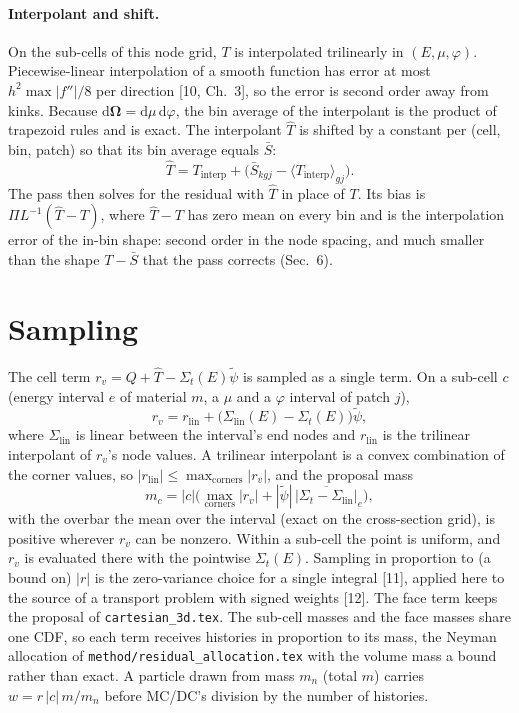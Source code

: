 \documentclass[11pt]{article}
\newcommand{\tpsi}{\tilde\psi}
\newcommand{\Sbar}{\bar S}
\newcommand{\Sigt}{\Sigma_t}
\newcommand{\Om}{\boldsymbol\Omega}
\newcommand{\That}{\hat T}
\begin{document}
\paragraph{Interpolant and shift.} On the sub-cells of this node grid, $T$ is
interpolated trilinearly in $(E,\mu,\varphi)$. Piecewise-linear interpolation of a
smooth function has error at most $h^2\max|f''|/8$ per direction [10, Ch.~3], so the
error is second order away from kinks. Because $\mathrm d\Om = \mathrm d\mu\,
\mathrm d\varphi$, the bin average of the interpolant is the product of trapezoid
rules and is exact. The interpolant $\That$ is shifted by a constant per (cell, bin,
patch) so that its bin average equals $\Sbar$:
\begin{equation}
  \That = T_{\text{interp}} + \big(\Sbar_{kgj} - \langle T_{\text{interp}}\rangle_{gj}\big).
\end{equation}
The pass then solves for the residual with $\That$ in place of $T$. Its bias is
$\Pi L^{-1}(\That - T)$, where $\That-T$ has zero mean on every bin and is the
interpolation error of the in-bin shape: second order in the node spacing, and much
smaller than the shape $T-\Sbar$ that the pass corrects (Sec.~6).

\section{Sampling}

The cell term $r_v = Q + \That - \Sigt(E)\tpsi$ is sampled as a single term. On a
sub-cell $c$ (energy interval $e$ of material $m$, a $\mu$ and a $\varphi$
interval of patch $j$),
\begin{equation}
  r_v = r_{\text{lin}} + \big(\Sigma_{\text{lin}}(E) - \Sigt(E)\big)\tpsi ,
\end{equation}
where $\Sigma_{\text{lin}}$ is linear between the interval's end nodes and
$r_{\text{lin}}$ is the trilinear interpolant of $r_v$'s node values. A trilinear
interpolant is a convex combination of the corner values, so
$|r_{\text{lin}}|\le\max_{\text{corners}}|r_v|$, and the proposal mass
\begin{equation}
  m_c = |c|\Big(\max_{\text{corners}}|r_v| + |\tpsi|\,\overline{|\Sigt-\Sigma_{\text{lin}}|}_e\Big),
\end{equation}
with the overbar the mean over the interval (exact on the cross-section grid), is
positive wherever $r_v$ can be nonzero. Within a sub-cell the point is uniform, and
$r_v$ is evaluated there with the pointwise $\Sigt(E)$. Sampling in proportion to
(a bound on) $|r|$ is the zero-variance choice for a single integral [11], applied
here to the source of a transport problem with signed weights [12]. The face term
keeps the proposal of \texttt{cartesian\_3d.tex}. The sub-cell masses and the face
masses share one CDF, so each term receives histories in proportion to its mass,
the Neyman allocation of \texttt{method/residual\_allocation.tex} with the volume mass
a bound rather than exact. A particle drawn from mass $m_n$ (total $m$) carries
$w = r\,|c|\,m/m_n$ before MC/DC's division by the number of histories.
\end{document}
